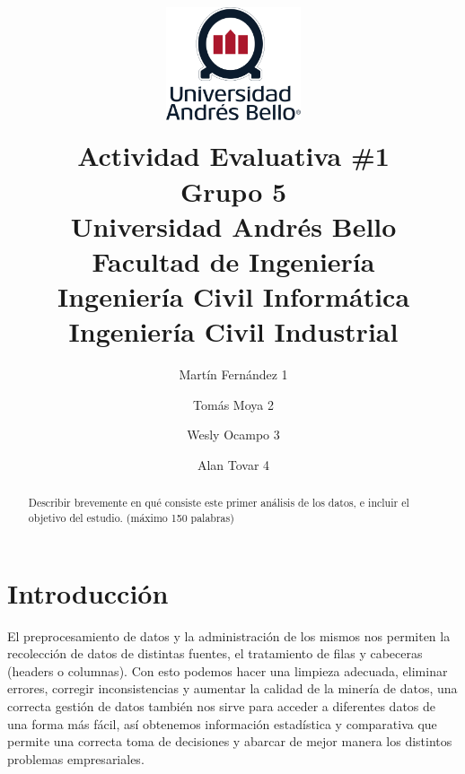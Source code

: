 \documentclass[]{elsarticle} %
\begin{document}
\begin{frontmatter}

  \title{\includegraphics[width=1.5625in,height=1.5625in]{logo_UNAB.png}\\
Actividad Evaluativa \#1\\
Grupo 5\\
Universidad Andrés Bello\\
Facultad de Ingeniería\\
Ingeniería Civil Informática\\
Ingeniería Civil Industrial}
    \author[]{Martín Fernández 1%
  }
    \author[]{Tomás Moya 2}
    \author[]{Wesly Ocampo 3%
  }
    \author[]{Alan Tovar 4%
  }
  
  \begin{abstract}
  Describir brevemente en qué consiste este primer análisis de los
  datos, e incluir el objetivo del estudio. (máximo 150 palabras)
  \end{abstract}
  
 \end{frontmatter}

\newpage

\section{Introducción}

El preprocesamiento de datos y la administración de los mismos nos
permiten la recolección de datos de distintas fuentes, el tratamiento de
filas y cabeceras (headers o columnas). Con esto podemos hacer una
limpieza adecuada, eliminar errores, corregir inconsistencias y aumentar
la calidad de la minería de datos, una correcta gestión de datos también
nos sirve para acceder a diferentes datos de una forma más fácil, así
obtenemos información estadística y comparativa que permite una correcta
toma de decisiones y abarcar de mejor manera los distintos problemas
empresariales.
\end{document}
